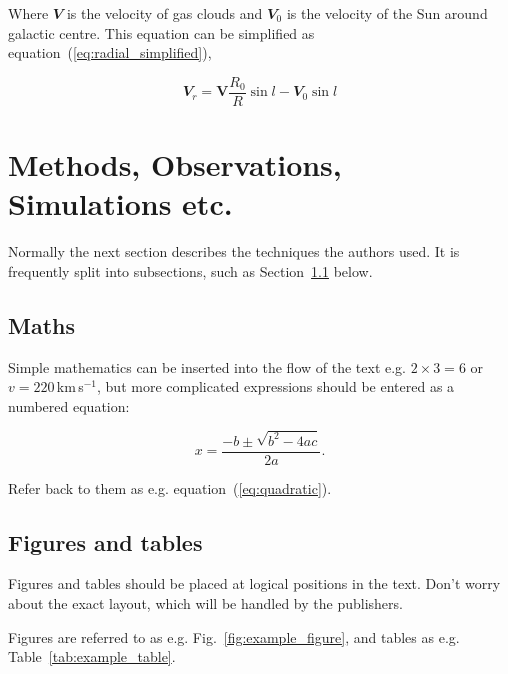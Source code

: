 \documentclass[fleqn,usenatbib]{mnras}
\begin{document}
Where $\mathbfit{V}$ is the velocity of gas clouds and $\mathbfit{V}_{0}$ is the velocity of the Sun around galactic centre. This equation can be simplified as equation~(\ref{eq:radial_simplified}),

\begin{equation}
 \mathbfit{V}_{r}=\mathbf{V}\frac{\mathit{R}_{0}}{\mathit{R}}\sin l-\mathbfit{V}_{0}\sin l
 \label{eq:radial_simplified}
\end{equation} 

\section{Methods, Observations, Simulations etc.}

Normally the next section describes the techniques the authors used.
It is frequently split into subsections, such as Section~\ref{sec:maths} below.

\subsection{Maths}
\label{sec:maths} %

Simple mathematics can be inserted into the flow of the text e.g. $2\times3=6$
or $v=220$\,km\,s$^{-1}$, but more complicated expressions should be entered
as a numbered equation:

\begin{equation}
    x=\frac{-b\pm\sqrt{b^2-4ac}}{2a}.
	\label{eq:quadratic}
\end{equation}

Refer back to them as e.g. equation~(\ref{eq:quadratic}).

\subsection{Figures and tables}

Figures and tables should be placed at logical positions in the text. Don't
worry about the exact layout, which will be handled by the publishers.

Figures are referred to as e.g. Fig.~\ref{fig:example_figure}, and tables as
e.g. Table~\ref{tab:example_table}.
\end{document}

